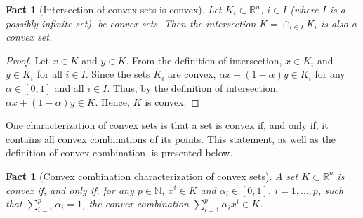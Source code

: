 \documentclass[smallextended,numbook,nospthms]{svjour3}
\theoremstyle{plain}
\newtheorem{fact}[theorem]{Fact}
\theoremstyle{definition}
\def\RR{\mathds R}
\def\NN{\mathds N}
\begin{document}
\begin{fact}[Intersection of convex sets is convex]\label{fact:cap convex}
Let $K_i \subset \RR^n$, $i \in I$ (where $I$ is a possibly infinite set), be convex sets. Then the intersection $K=\cap_{i \in I}K_i$ is also a convex set.
\end{fact}	
\begin{proof}
	Let $x \in K$ and $y \in K$. From the definition of intersection, $x \in K_i$ and $y \in K_i$ for all $i \in I$. Since the sets $K_i$ are convex, $\alpha x + (1-\alpha)y \in K_i$ for any $\alpha \in [0,1]$ and all $i \in I$. Thus, by the definition of intersection, $\alpha x + (1-\alpha)y \in K$. Hence, $K$ is convex.
\end{proof}

One characterization of convex sets is that a set is convex if, and only if, it contains all convex combinations of its points. This statement, as well as the definition of convex combination, is presented below.
\begin{fact}[Convex combination characterization of convex sets]\label{fact:convex conv comb}
	A set $K \subset \RR^n$ is convex if, and only if, for any $p \in \NN$, $x^{i} \in K$ and $\alpha_{i} \in [0,1]$, $i=1,\ldots,p$, such that $\sum_{i=1}^{p}\alpha_{i}=1$, the \emph{convex combination} $\sum_{i=1}^{p} \alpha_{i}x^{i} \in K$.
\end{fact}
\end{document}
